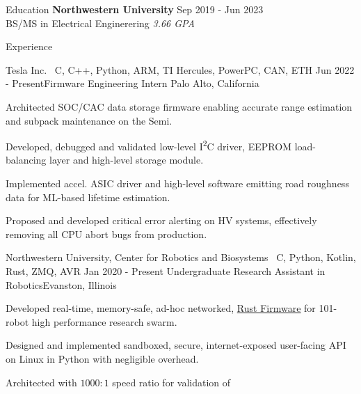 \documentclass{resume}
\begin{document}
\begin{rSection}{Education}
    {\bf Northwestern University}
    \hfill {Sep 2019 - Jun 2023} \\ 
    BS/MS in Electrical Enginerering
    \hfill {\em 3.66 GPA}
\end{rSection}

\begin{rSection}{Experience}
    \begin{rSubsection}
        {Tesla Inc. \mid\ \textnormal{C, C++, Python, ARM, TI Hercules,
        PowerPC, CAN, ETH}} {Jun 2022 - Present}{Firmware Engineering Intern}
        {Palo Alto, California}
        \item Architected SOC/CAC data storage firmware enabling accurate range
            estimation and subpack maintenance on the Semi.
        \item Developed, debugged and validated low-level I\textsuperscript{2}C
            driver, EEPROM load-balancing layer and high-level storage module.
        \item Implemented accel. ASIC driver and high-level software
            emitting road roughness data for ML-based lifetime estimation.
        \item Proposed and developed critical error alerting on HV systems,
            effectively removing all CPU abort bugs from production.
    \end{rSubsection}
    \begin{rSubsection}
        {Northwestern University, Center for Robotics and Biosystems
         \mid\ \textnormal{C, Python, Kotlin, Rust, ZMQ, AVR}
        }
        {Jan 2020 - Present}
        {Undergraduate Research Assistant in Robotics}{Evanston, Illinois}
        \item Developed real-time, memory-safe, ad-hoc networked,
            \underline{\href{https://github.com/coachbots/cocos}{Rust
            Firmware}} for 101-robot high performance research swarm.
        \item Designed and implemented sandboxed, secure, internet-exposed
            user-facing API on Linux in Python with negligible overhead.
        \item Architected
            \underline{} with $1000:1$ speed ratio for validation of

\end{rSubsection}
\end{rSection}
\end{document}
